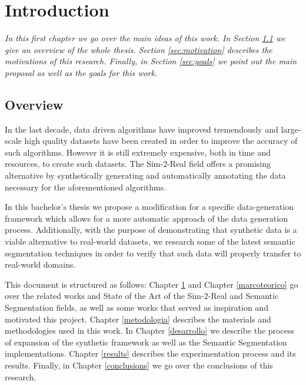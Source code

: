 
\chapter{Introduction}
\label{introduction}
\textit{In this first chapter we go over the main ideas of this work. In Section \ref{sec:overview} we give an overview of the whole thesis. Section \ref{sec:motivation} describes the motivations of this research. Finally, in Section \ref{sec:goals} we point out the main proposal as well as the goals for this work.}

\section{Overview}
\label{sec:overview}
In the last decade, data driven algorithms have improved tremendously and large-scale high quality datasets have been created in order to improve the accuracy of such algorithms. However it is still extremely expensive, both in time and resources, to create such datasets. The Sim-2-Real field offers a promising alternative by synthetically generating and automatically annotating the data necessary for the aforementioned algorithms.

In this bachelor's thesis we propose a modification for a specific data-generation framework which allows for a more automatic approach of the data generation process. Additionally, with the purpose of demonstrating that synthetic data is a viable alternative to real-world datasets, we research some of the latest semantic segmentation techniques in order to verify that such data will properly transfer to real-world domains.

This document is structured as follows: Chapter \ref{introduction} and Chapter \ref{marcoteorico} go over the related works and State of the Art of the Sim-2-Real and Semantic Segmentation fields, as well as some works that served as inspiration and motivated this project. Chapter \ref{metodologia} describes the materials and methodologies used in this work. In Chapter \ref{desarrollo} we describe the process of expansion of the synthetic framework as well as the Semantic Segmentation implementations. Chapter \ref{results} describes the experimentation process and its results. Finally, in Chapter \ref{conclusions} we go over the conclusions of this research.


